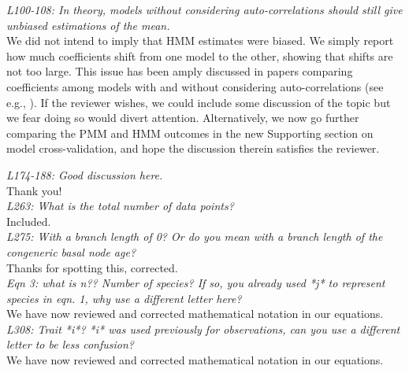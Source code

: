 \documentclass[11pt]{article}
\begin{document}

\emph{L100-108: In theory, models without considering auto-correlations should still give unbiased estimations of the mean.}\\
We did not intend to imply that HMM estimates were biased. We simply report how much coefficients shift from one model to the other, showing that shifts are not too large. This issue has been amply discussed in papers comparing coefficients among models with and without considering auto-correlations (see e.g., \cite{mauricio2009coefficient}). If the reviewer wishes, we could include some discussion of the topic but we fear doing so would divert attention. Alternatively, we now go further comparing the PMM and HMM outcomes in the new Supporting section on model cross-validation, and hope the discussion therein satisfies the reviewer. 


\emph{L174-188: Good discussion here.}\\

Thank you!\\ %

\emph{L263: What is the total number of data points?}\\
Included.\\ 

\emph{L275: With a branch length of 0? Or do you mean with a branch length of the congeneric basal node age?}\\
Thanks for spotting this, corrected.\\

\emph{Eqn 3: what is n?? Number of species? If so, you already used *j* to represent species in eqn. 1, why use a different letter here?}\\
We have now reviewed and corrected mathematical notation in our equations.\\


\emph{L308: Trait *i*? *i* was used previously for observations, can you use a different letter to be less confusion?}\\
We have now reviewed and corrected mathematical notation in our equations.\\





\end{document}
